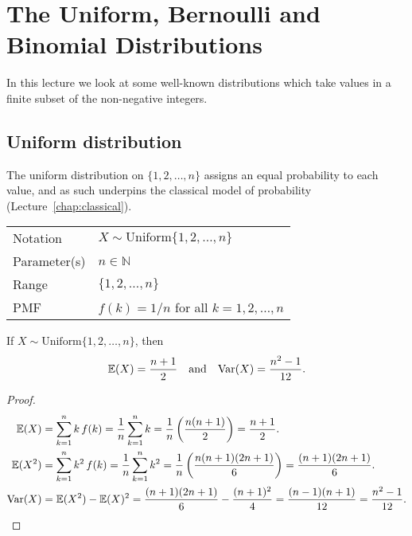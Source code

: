 \chapter{The Uniform, Bernoulli and Binomial Distributions}\label{chap:unif-bern-bino}

In this lecture we look at some well-known distributions which take values in a finite subset of the non-negative integers.
\section{Uniform distribution}

The uniform distribution on $\{1,2,\ldots,n\}$ assigns an equal probability to each value, and as such underpins the classical model of probability (Lecture~\ref{chap:classical}).
 
\begin{center}
\begin{tabular}{ll}\hline
Notation		& $X\sim\text{Uniform}\{1,2,\ldots,n\}$ \\
Parameter(s)	& $n\in\mathbb{N}$ \\
Range			& $\{1,2,\ldots,n\}$ \\
PMF				& $f(k) = 1/n$ for all $k=1,2,\ldots,n$ \\ \hline
\end{tabular}
\end{center}

\begin{lemma}
If $X\sim\text{Uniform}\{1,2,\ldots,n\}$, then 
\[
\mathbb{E}(X)= \frac{n+1}{2} \quad\text{and}\quad \text{Var}(X) = \frac{n^2-1}{12}.
\]
\end{lemma}

\begin{proof}
\begin{align*}
\mathbb{E}(X) 
	& = \sum_{k=1}^n k\,f(k)
	= \frac{1}{n}\sum_{k=1}^n k 
	= \frac{1}{n}\left(\frac{n(n+1)}{2}\right)
	= \frac{n+1}{2}. \\
\mathbb{E}(X^2) 
	& = \sum_{k=1}^n k^2\,f(k)
	= \frac{1}{n}\sum_{k=1}^n k^2 
	= \frac{1}{n}\left(\frac{n(n+1)(2n+1)}{6}\right)
	= \frac{(n+1)(2n+1)}{6}. \\
\text{Var}(X)
	& = \mathbb{E}(X^2)-\mathbb{E}(X)^2  
	= \frac{(n+1)(2n+1)}{6} - \frac{(n+1)^2}{4} 
	  = \frac{(n-1)(n+1)}{12}
	  = \frac{n^2-1}{12}.
\end{align*}
\end{proof}

